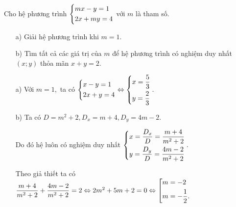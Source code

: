 \begin{ex}%
   Cho hệ phương trình $ \left\{\begin{aligned}& mx-y=1 \\ & 2x+my=4\end{aligned}\right.$ với $m$ là tham số.
    \begin{enumerate}
        \item[a)]  Giải hệ phương trình khi $m = 1$.
        \item[b)] Tìm tất cả các giá trị của $m$ để hệ phương trình có nghiệm duy nhất $(x;y)$ thỏa mãn $x + y = 2.$
    \end{enumerate}
\loigiai
    {
    \begin{enumerate}
        \item[a)] Với $m=1,$ ta có  $ \left\{\begin{aligned}& x-y=1 \\ & 2x+y=4\end{aligned}\right. \Leftrightarrow \left\{\begin{aligned}& x = \dfrac{5}{3} \\ & y = \dfrac{2}{3}\end{aligned}\right..$ 
        \item[b)]  Ta có $D = m^2+2, D_x = m+4, D_y = 4m-2$. 

Do đó hệ luôn có nghiệm duy nhất $\left\{\begin{aligned} & x = \dfrac{D_x}{D}=\dfrac{m+4}{m^2+2} \\ & y = \dfrac{D_y}{D} = \dfrac{4m-2}{m^2+2}\end{aligned}\right.. $

Theo giả thiết ta có $\dfrac{m+4}{m^2+2}+  \dfrac{4m-2}{m^2+2}= 2 \Leftrightarrow 2m^2 +5m+2=0 \Leftrightarrow \left[\begin{aligned}& m = -2 \\& m = -\dfrac{1}{2}.\end{aligned}\right.$
    \end{enumerate}
 }
\end{ex}

